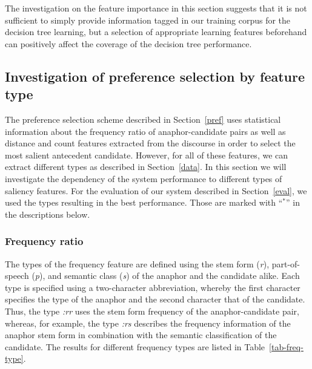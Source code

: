 The investigation on the feature importance in this section suggests that it is not sufficient
to simply provide information tagged in our training corpus for the decision tree learning,
but a selection of appropriate learning features beforehand can positively affect the coverage
of the decision tree performance.

\subsection{Investigation of preference selection by feature type}
\label{feature-pref-type}

The preference selection scheme described in Section~\ref{pref} uses statistical information about
the frequency ratio of anaphor-can\-didate pairs as well as distance and count features extracted
from the discourse in order to select the most salient antecedent candidate.
However, for all of these features, we can extract different types as described in Section~\ref{data}.
In this section we will investigate the dependency of the system performance to different types
of saliency features. 
For the evaluation of our system described in Section~\ref{eval}, we used the types
resulting in the best performance. Those are marked with ``{\large ${}^{*}$}'' in the descriptions below.

\subsubsection{Frequency ratio}
\label{pref-freq-type}

The types of the frequency feature are defined using the stem form ({\em r}),
part-of-speech ({\em p}), and semantic class ({\em s}) of the anaphor and the candidate alike.
Each type is specified using a two-character abbreviation, whereby the first character specifies the
type of the anaphor and the second character that of the candidate. Thus, the type {\em :rr}
uses the stem form frequency of the anaphor-candidate pair, whereas, for example, the type
{\em :rs} describes the frequency information of the anaphor stem form in combination
with the semantic classification of the candidate. 
The results for different frequency types are listed in Table~\ref{tab-freq-type}.

